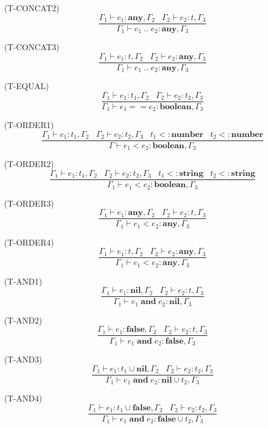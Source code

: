 \documentclass{paper}
\newcommand{\Any}{\mathbf{any}}
\newcommand{\Nil}{\mathbf{nil}}
\newcommand{\False}{\mathbf{false}}
\newcommand{\Boolean}{\mathbf{boolean}}
\newcommand{\Number}{\mathbf{number}}
\newcommand{\String}{\mathbf{string}}
\newcommand{\mylabel}[1]{\; (\textsc{#1})}
\newcommand{\env}{\Gamma}
\newcommand{\subtype}{<:}
\begin{document}
\mylabel{T-CONCAT2}
\[
\dfrac{\env_{1} \vdash e_{1}:\Any, \env_{2} \;\;\;
       \env_{2} \vdash e_{2}:t, \env_{3}}
      {\env_{1} \vdash e_{1} \; {..} \; e_{2}:\Any, \env_{3}}
\]

\mylabel{T-CONCAT3}
\[
\dfrac{\env_{1} \vdash e_{1}:t, \env_{2} \;\;\;
       \env_{2} \vdash e_{2}:\Any, \env_{3}}
      {\env_{1} \vdash e_{1} \; {..} \; e_{2}:\Any, \env_{3}}
\]

\mylabel{T-EQUAL}
\[
\dfrac{\env_{1} \vdash e_{1}:t_{1}, \env_{2} \;\;\;
       \env_{2} \vdash e_{2}:t_{2}, \env_{3}}
      {\env_{1} \vdash e_{1} == e_{2}:\Boolean, \env_{3}}
\]

\mylabel{T-ORDER1}
\[
\dfrac{\env_{1} \vdash e_{1}:t_{1}, \env_{2} \;\;\;
       \env_{2} \vdash e_{2}:t_{2}, \env_{3} \;\;\;
       t_{1} \subtype \Number \;\;\;
       t_{2} \subtype \Number}
      {\env \vdash e_{1} < e_{2}:\Boolean, \env_{3}}
\]

\mylabel{T-ORDER2}
\[
\dfrac{\env_{1} \vdash e_{1}:t_{1}, \env_{2} \;\;\;
       \env_{2} \vdash e_{2}:t_{2}, \env_{3} \;\;\;
       t_{1} \subtype \String \;\;\;
       t_{2} \subtype \String}
      {\env_{1} \vdash e_{1} < e_{2}:\Boolean, \env_{3}}
\]

\mylabel{T-ORDER3}
\[
\dfrac{\env_{1} \vdash e_{1}:\Any, \env_{2} \;\;\;
       \env_{2} \vdash e_{2}:t, \env_{3}}
      {\env_{1} \vdash e_{1} < e_{2}:\Any, \env_{3}}
\]

\mylabel{T-ORDER4}
\[
\dfrac{\env_{1} \vdash e_{1}:t, \env_{2} \;\;\;
       \env_{2} \vdash e_{2}:\Any, \env_{3}}
      {\env_{1} \vdash e_{1} < e_{2}:\Any, \env_{3}}
\]

\mylabel{T-AND1}
\[
\dfrac{\env_{1} \vdash e_{1}:\Nil, \env_{2} \;\;\;
       \env_{2} \vdash e_{2}:t, \env_{3}}
      {\env_{1} \vdash e_{1} \; \mathbf{and} \; e_{2}:\Nil, \env_{3}}
\]

\mylabel{T-AND2}
\[
\dfrac{\env_{1} \vdash e_{1}:\False, \env_{2} \;\;\;
       \env_{2} \vdash e_{2}:t, \env_{3}}
      {\env_{1} \vdash e_{1} \; \mathbf{and} \; e_{2}:\False, \env_{3}}
\]

\mylabel{T-AND3}
\[
\dfrac{\env_{1} \vdash e_{1}:t_{1} \cup \Nil, \env_{2} \;\;\;
       \env_{2} \vdash e_{2}:t_{2}, \env_{3}}
      {\env_{1} \vdash e_{1} \; \mathbf{and} \; e_{2}:\Nil \cup t_{2}, \env_{3}}
\]

\mylabel{T-AND4}
\[
\dfrac{\env_{1} \vdash e_{1}:t_{1} \cup \False, \env_{2} \;\;\;
       \env_{2} \vdash e_{2}:t_{2}, \env_{3}}
      {\env_{1} \vdash e_{1} \; \mathbf{and} \; e_{2}:\False \cup t_{2}, \env_{3}}
\]
\end{document}
